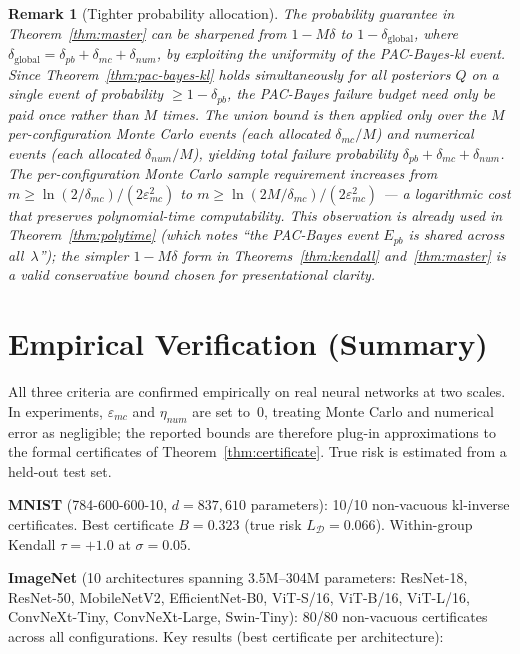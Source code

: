 \documentclass[11pt,a4paper]{article}
\newtheorem{remark}[theorem]{Remark}
\newcommand{\cD}{\mathcal{D}}
\begin{document}
\begin{remark}[Tighter probability allocation]
\label{rem:tighter}
The probability guarantee in Theorem~\ref{thm:master} can be sharpened from $1 - M\delta$ to $1 - \delta_{\mathrm{global}}$, where $\delta_{\mathrm{global}} = \delta_{pb} + \delta_{mc} + \delta_{num}$, by exploiting the uniformity of the PAC-Bayes-kl event. Since Theorem~\ref{thm:pac-bayes-kl} holds simultaneously for \emph{all} posteriors $Q$ on a single event of probability $\ge 1 - \delta_{pb}$, the PAC-Bayes failure budget need only be paid once rather than $M$ times. The union bound is then applied only over the $M$ per-configuration Monte Carlo events (each allocated $\delta_{mc}/M$) and numerical events (each allocated $\delta_{num}/M$), yielding total failure probability $\delta_{pb} + \delta_{mc} + \delta_{num}$. The per-configuration Monte Carlo sample requirement increases from $m \ge \ln(2/\delta_{mc})/(2\varepsilon_{mc}^2)$ to $m \ge \ln(2M/\delta_{mc})/(2\varepsilon_{mc}^2)$ --- a logarithmic cost that preserves polynomial-time computability. This observation is already used in Theorem~\ref{thm:polytime} (which notes ``the PAC-Bayes event $E_{pb}$ is shared across all~$\lambda$''); the simpler $1 - M\delta$ form in Theorems~\ref{thm:kendall} and~\ref{thm:master} is a valid conservative bound chosen for presentational clarity.
\end{remark}

\section{Empirical Verification (Summary)}
\label{sec:empirical}

All three criteria are confirmed empirically on real neural networks at two scales. In experiments, $\varepsilon_{mc}$ and $\eta_{num}$ are set to~$0$, treating Monte Carlo and numerical error as negligible; the reported bounds are therefore plug-in approximations to the formal certificates of Theorem~\ref{thm:certificate}. True risk is estimated from a held-out test set.

\textbf{MNIST} (784-600-600-10, $d = 837{,}610$ parameters): 10/10 non-vacuous kl-inverse certificates. Best certificate $B = 0.323$ (true risk $L_\cD = 0.066$). Within-group Kendall $\tau = +1.0$ at $\sigma = 0.05$.

\textbf{ImageNet} (10 architectures spanning 3.5M--304M parameters: ResNet-18, ResNet-50, MobileNetV2, EfficientNet-B0, ViT-S/16, ViT-B/16, ViT-L/16, ConvNeXt-Tiny, ConvNeXt-Large, Swin-Tiny): 80/80 non-vacuous certificates across all configurations. Key results (best certificate per architecture):
\end{document}
